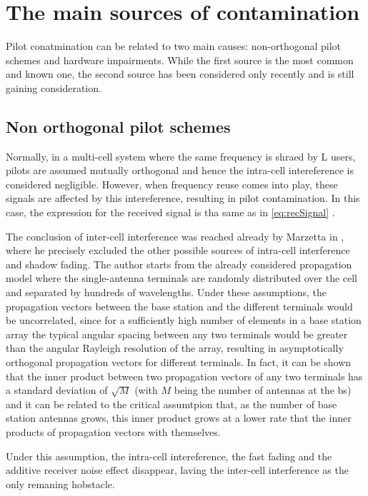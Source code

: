 \documentclass[11pt]{book}
\begin{document}
\section{The main sources of contamination}
Pilot conatmination can be related to two main causes: non-orthogonal pilot schemes and hardware impairments.
While the first source is the most common and known one, the second source has been considered only recently and is still gaining consideration.

\subsection{Non orthogonal pilot schemes}
Normally, in a multi-cell system where the same frequency is shraed by L users, pilots are assumed mutually orthogonal and hence the intra-cell intereference is considered negligible. However, when frequency reuse comes into play, these signals are affected by this intereference, resulting in pilot contamination. In this case, the expression for the received signal is tha same as in \ref{eq:recSignal} \cite{Elijah2016}.

The conclusion of inter-cell interference was reached already by Marzetta in \cite{Marzetta2010}, where he precisely excluded the other possible sources of intra-cell interference and shadow fading. The author starts from the already considered propagation model where the single-antenna terminals are randomly distributed over the cell and separated by hundreds of wavelengths. Under these assumptions, the propagation vectors between the base station and the different terminals would be uncorrelated, since for a sufficiently high number of elements in a base station array the typical angular spacing between any two terminals would be greater than the angular Rayleigh resolution of the array, resulting in asymptotically orthogonal propagation vectors for different terminals. In fact, it can be shown that the inner product between two propagation vectors of any two terminals has a standard deviation of $\sqrt{M}$ (with $M$ being the number of antennas at the \gls{bs}) and it can be related to the critical assumtpion that, as the number of base station antennas grows, this inner product grows at a lower rate that the inner products of propagation vectors with themselves.

Under this assumption, the intra-cell intereference, the fast fading and the additive receiver noise effect disappear, laving the inter-cell interference as the only remaning hobstacle.
\end{document}
